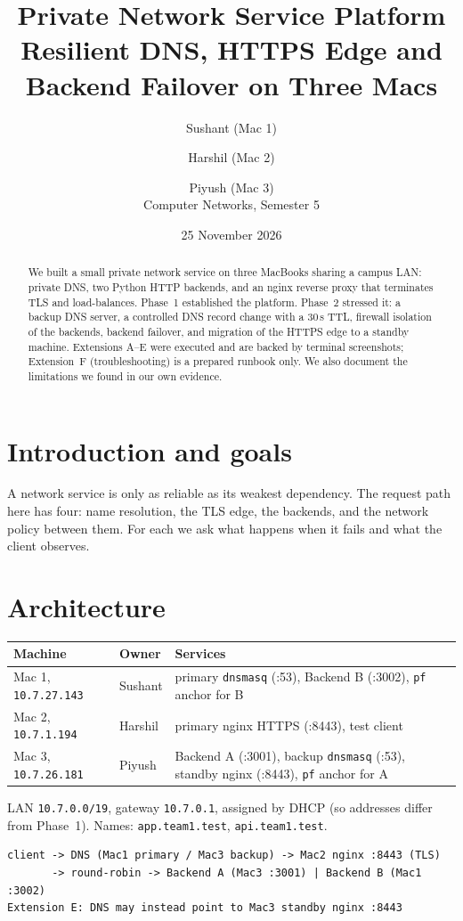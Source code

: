 \documentclass[11pt,a4paper]{article}
\title{Private Network Service Platform\\[2pt]\large Resilient DNS, HTTPS Edge and Backend Failover on Three Macs}
\author{Sushant (Mac 1) \and Harshil (Mac 2) \and Piyush (Mac 3)\\Computer Networks, Semester 5}
\date{25 November 2026}
\begin{document}
\maketitle

\begin{abstract}
We built a small private network service on three MacBooks sharing a campus LAN: private DNS, two Python HTTP backends, and an nginx reverse proxy that terminates TLS and load-balances. Phase~1 established the platform. Phase~2 stressed it: a backup DNS server, a controlled DNS record change with a 30\,s TTL, firewall isolation of the backends, backend failover, and migration of the HTTPS edge to a standby machine. Extensions A--E were executed and are backed by terminal screenshots; Extension~F (troubleshooting) is a prepared runbook only. We also document the limitations we found in our own evidence.
\end{abstract}

\section{Introduction and goals}
A network service is only as reliable as its weakest dependency. The request path here has four: name resolution, the TLS edge, the backends, and the network policy between them. For each we ask what happens when it fails and what the client observes.

\section{Architecture}
\begin{tabularx}{\linewidth}{llX}
\toprule
Machine & Owner & Services \\
\midrule
Mac 1, \texttt{10.7.27.143} & Sushant & primary \texttt{dnsmasq} (:53), Backend B (:3002), \texttt{pf} anchor for B\\
Mac 2, \texttt{10.7.1.194} & Harshil & primary nginx HTTPS (:8443), test client\\
Mac 3, \texttt{10.7.26.181} & Piyush & Backend A (:3001), backup \texttt{dnsmasq} (:53), standby nginx (:8443), \texttt{pf} anchor for A\\
\bottomrule
\end{tabularx}

\medskip\noindent LAN \texttt{10.7.0.0/19}, gateway \texttt{10.7.0.1}, assigned by DHCP (so addresses differ from Phase~1). Names: \texttt{app.team1.test}, \texttt{api.team1.test}.

\begin{lstlisting}
client -> DNS (Mac1 primary / Mac3 backup) -> Mac2 nginx :8443 (TLS)
       -> round-robin -> Backend A (Mac3 :3001) | Backend B (Mac1 :3002)
Extension E: DNS may instead point to Mac3 standby nginx :8443
\end{lstlisting}
\end{document}
